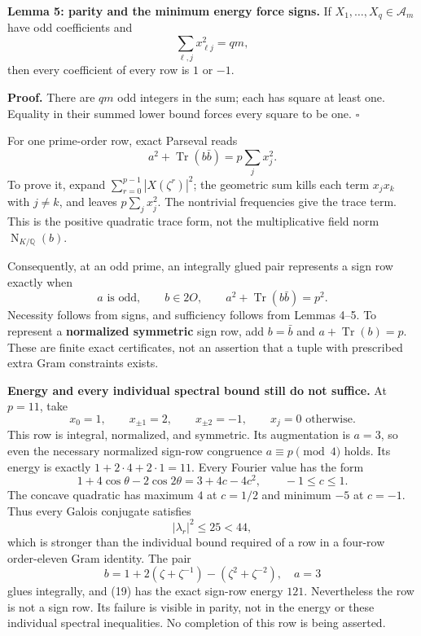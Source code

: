 \documentclass[
  11pt,
]{article}
\begin{document}
\textbf{Lemma 5: parity and the minimum energy force signs.} If
\(X_1,\ldots,X_q\in\mathcal A_m\) have odd coefficients and \[
                 \sum_{\ell,j}x_{\ell j}^2=qm,            \tag{18}
\] then every coefficient of every row is \(1\) or \(-1\).

\textbf{Proof.} There are \(qm\) odd integers in the sum; each has
square at least one. Equality in their summed lower bound forces every
square to be one. \(\square\)

For one prime-order row, exact Parseval reads \[
 a^2+\operatorname{Tr}(b\bar b)=p\sum_jx_j^2.              \tag{19}
\] To prove it, expand \(\sum_{r=0}^{p-1}|X(\zeta^r)|^2\); the geometric
sum kills each term \(x_jx_k\) with \(j\ne k\), and leaves
\(p\sum_jx_j^2\). The nontrivial frequencies give the trace term. This
is the positive quadratic trace form, not the multiplicative field norm
\(\operatorname{N}_{K/\mathbb Q}(b)\).

Consequently, at an odd prime, an integrally glued pair represents a
sign row exactly when \[
 a\text{ is odd},\qquad b\in2O,\qquad
 a^2+\operatorname{Tr}(b\bar b)=p^2.                      \tag{20}
\] Necessity follows from signs, and sufficiency follows from Lemmas
4--5. To represent a \textbf{normalized symmetric} sign row, add
\(b=\bar b\) and \(a+\operatorname{Tr}(b)=p\). These are finite exact
certificates, not an assertion that a tuple with prescribed extra Gram
constraints exists.

\textbf{Energy and every individual spectral bound still do not
suffice.} At \(p=11\), take \[
 x_0=1,\qquad x_{\pm1}=2,\qquad x_{\pm2}=-1,
 \qquad x_j=0\text{ otherwise}.                           \tag{21}
\] This row is integral, normalized, and symmetric. Its augmentation is
\(a=3\), so even the necessary normalized sign-row congruence
\(a\equiv p\pmod4\) holds. Its energy is exactly
\(1+2\cdot4+2\cdot1=11\). Every Fourier value has the form \[
 1+4\cos\theta-2\cos2\theta
      =3+4c-4c^2,\qquad -1\le c\le1.
 \] The concave quadratic has maximum \(4\) at \(c=1/2\) and minimum
\(-5\) at \(c=-1\). Thus every Galois conjugate satisfies \[
 |\lambda_r|^2\le25<44,
 \] which is stronger than the individual bound required of a row in a
four-row order-eleven Gram identity. The pair \[
 b=1+2(\zeta+\zeta^{-1})-(\zeta^2+\zeta^{-2}),\quad a=3
 \] glues integrally, and (19) has the exact sign-row energy \(121\).
Nevertheless the row is not a sign row. Its failure is visible in
parity, not in the energy or these individual spectral inequalities. No
completion of this row is being asserted.
\end{document}
